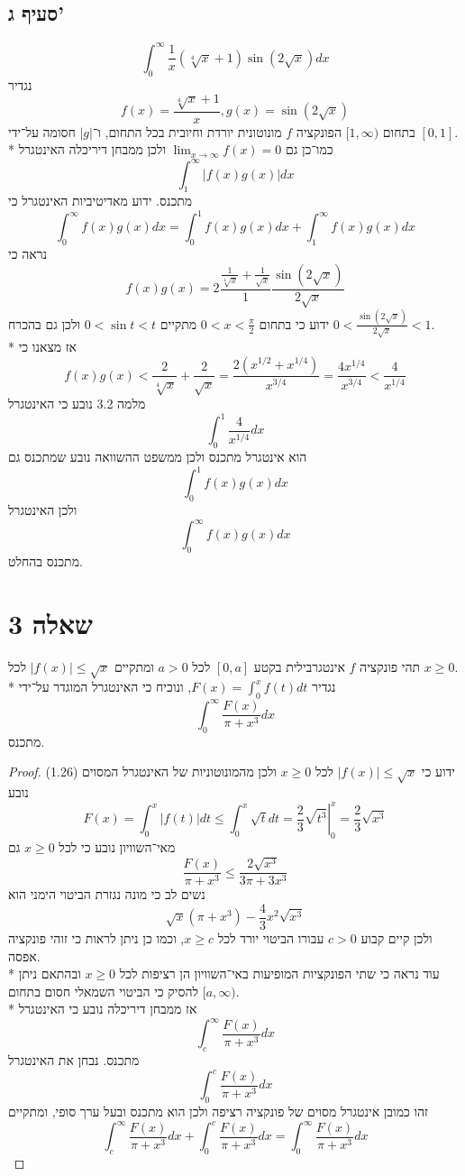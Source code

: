 \subsection{סעיף ג'}
\[
	\int_0^\infty \frac{1}{x} (\sqrt[4]{x} + 1) \sin \left( 2 \sqrt{x} \right) dx
\]
נגדיר
\[
	f(x) = \frac{\sqrt[4]{x} + 1}{x}, g(x) = \sin\left(2\sqrt{x}\right)
\]
בתחום $[1, \infty)$ הפונקציה $f$ מונוטונית יורדת וחיובית בכל התחום, ו־$|g|$ חסומה על־ידי $[0, 1]$. \\* %
כמו־כן גם $\lim_{x \to \infty} f(x) = 0$ ולכן ממבחן דיריכלה האינטגרל
\[
	\int_1^\infty |f(x) g(x)| dx
\] 
מתכנס. ידוע מאדיטיביות האינטגרל כי
\[
	\int_0^\infty f(x) g(x) dx = \int_0^1 f(x) g(x) dx + \int_1^\infty f(x) g(x) dx
\]
נראה כי
\[
	f(x) g(x) = 2\frac{\frac{1}{\sqrt[4]{x}} + \frac{1}{\sqrt{x}}}{1} \frac{\sin(2\sqrt{x})}{2\sqrt{x}}
\]
ידוע כי בתחום $0 < x < \frac{\pi}{2}$ מתקיים $0 < \sin t < t$ ולכן גם בהכרח $0 < \frac{\sin(2 \sqrt{x})}{2 \sqrt{x}} < 1$. \\*
אז מצאנו כי
\[
	f(x) g(x)
	< \frac{2}{\sqrt[4]{x}} + \frac{2}{\sqrt{x}}
	= \frac{2(x^{1/2} + x^{1/4})}{x^{3/4}}
	= \frac{4x^{1/4}}{x^{3/4}}
	< \frac{4}{x^{1/4}}
\]
מלמה 3.2 נובע כי האינטגרל
\[
	\int_0^1 \frac{4}{x^{1/4}} dx
\]
הוא אינטגרל מתכנס ולכן ממשפט ההשוואה נובע שמתכנס גם
\[
	\int_0^1 f(x) g(x) dx
\]
ולכן האינטגרל
\[
	\int_0^\infty f(x) g(x) dx
\]
מתכנס בהחלט.

\section{שאלה 3}
תהי פונקציה $f$ אינטגרבילית בקטע $[0, a]$ לכל $a > 0$ ומתקיים $\lvert f(x) \rvert \le \sqrt{x}$ לכל $x \ge 0$. \\*
נגדיר $F(x) = \int_0^x f(t) dt$, ונוכיח כי האינטגרל המוגדר על־ידי
\[
	\int_0^\infty \frac{F(x)}{\pi + x^3} dx \tag{1}
\]
מתכנס.
\begin{proof}
	ידוע כי $\lvert f(x) \rvert \le \sqrt{x}$ לכל $x \ge 0$ ולכן מהמונוטוניות של האינטגרל המסוים (1.26) נובע
	\[
		F(x) = \int_0^x \lvert f(t) \rvert dt \le \int_0^x \sqrt{t} dt = \left. \frac{2}{3} \sqrt{t^3} \right|_0^x = \frac{2}{3} \sqrt{x^3}
	\]
	מאי־השוויון נובע כי לכל $x \ge 0$ גם
	\[
		\frac{F(x)}{\pi + x^3} \le \frac{2 \sqrt{x^3}}{3 \pi + 3 x^3} \tag{2}
	\]
	נשים לב כי מונה נגזרת הביטוי הימני הוא
	\[
		\sqrt{x} (\pi + x^3) - \frac{4}{3} x^2 \sqrt{x^3}
	\]
	ולכן קיים קבוע $c > 0$ עבורו הביטוי יורד לכל $x \ge c$, וכמו כן ניתן לראות כי זוהי פונקציה אפסה. \\*
	עוד נראה כי שתי הפונקציות המופיעות באי־השוויון הן רציפות לכל $x \ge 0$ ובהתאם ניתן להסיק כי הביטוי השמאלי חסום בתחום $[a, \infty)$. \\* %
	אז ממבחן דיריכלה נובע כי האינטגרל
	\[
		\int_c^\infty \frac{F(x)}{\pi + x^3} dx
	\]
	מתכנס. נבחן את האינטגרל
	\[
		\int_0^c \frac{F(x)}{\pi + x^3} dx
	\]
	זהו כמובן אינטגרל מסוים של פונקציה רציפה ולכן הוא מתכנס ובעל ערך סופי, ומתקיים
	\[
		\int_c^\infty \frac{F(x)}{\pi + x^3} dx + \int_0^c \frac{F(x)}{\pi + x^3} dx
		= \int_0^\infty \frac{F(x)}{\pi + x^3} dx
	\]
\end{proof}

